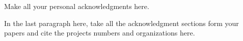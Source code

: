 
Make all your personal acknowledgments here. 

In the last paragraph here, take all the acknowledgment sections form your papers and cite the projects numbers and organizations here. 